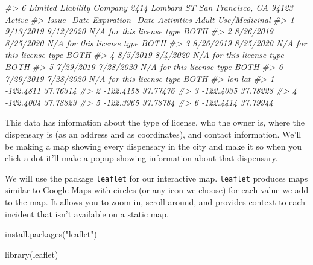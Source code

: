 \documentclass[
  12pt,
]{book}
\newenvironment{Shaded}{\begin{snugshade}}{\end{snugshade}}
\newcommand{\CommentTok}[1]{\textcolor[rgb]{0.37,0.37,0.37}{\textit{#1}}}
\newcommand{\FunctionTok}[1]{\textcolor[rgb]{0,0,0}{#1}}
\newcommand{\NormalTok}[1]{#1}
\newcommand{\StringTok}[1]{\textcolor[rgb]{0.5,0.5,0.5}{#1}}
\begin{document}
\begin{Shaded}
\begin{Highlighting}[]
\CommentTok{\#\textgreater{} 6 Limited Liability Company 2414 Lombard ST San Francisco, CA 94123 Active}
\CommentTok{\#\textgreater{}   Issue\_Date Expiration\_Date                Activities Adult{-}Use/Medicinal}
\CommentTok{\#\textgreater{} 1  9/13/2019       9/12/2020 N/A for this license type                BOTH}
\CommentTok{\#\textgreater{} 2  8/26/2019       8/25/2020 N/A for this license type                BOTH}
\CommentTok{\#\textgreater{} 3  8/26/2019       8/25/2020 N/A for this license type                BOTH}
\CommentTok{\#\textgreater{} 4   8/5/2019        8/4/2020 N/A for this license type                BOTH}
\CommentTok{\#\textgreater{} 5  7/29/2019       7/28/2020 N/A for this license type                BOTH}
\CommentTok{\#\textgreater{} 6  7/29/2019       7/28/2020 N/A for this license type                BOTH}
\CommentTok{\#\textgreater{}         lon      lat}
\CommentTok{\#\textgreater{} 1 {-}122.4811 37.76314}
\CommentTok{\#\textgreater{} 2 {-}122.4158 37.77476}
\CommentTok{\#\textgreater{} 3 {-}122.4035 37.78228}
\CommentTok{\#\textgreater{} 4 {-}122.4004 37.78823}
\CommentTok{\#\textgreater{} 5 {-}122.3965 37.78784}
\CommentTok{\#\textgreater{} 6 {-}122.4414 37.79944}
\end{Highlighting}
\end{Shaded}

This data has information about the type of license, who the owner is, where the dispensary is (as an address and as coordinates), and contact information. We'll be making a map showing every dispensary in the city and make it so when you click a dot it'll make a popup showing information about that dispensary.

We will use the package \texttt{leaflet} for our interactive map. \texttt{leaflet} produces maps similar to Google Maps with circles (or any icon we choose) for each value we add to the map. It allows you to zoom in, scroll around, and provides context to each incident that isn't available on a static map.

\begin{Shaded}
\begin{Highlighting}[]
\FunctionTok{install.packages}\NormalTok{(}\StringTok{"leaflet"}\NormalTok{)}
\end{Highlighting}
\end{Shaded}

\begin{Shaded}
\begin{Highlighting}[]
\FunctionTok{library}\NormalTok{(leaflet)}
\end{Highlighting}
\end{Shaded}
\end{document}
